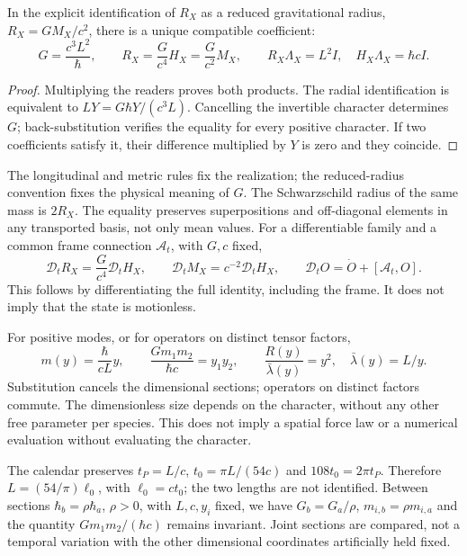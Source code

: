 \begin{proposition}
\label{hmtcuatro:gea:coeficiente} In the explicit identification of $R_X$ as a reduced gravitational radius, $R_X=GM_X/c^2$, there is a unique compatible coefficient:
\begin{equation}
G=\frac{c^3L^2}{\hbar},\qquad
R_X=\frac{G}{c^4}H_X=\frac{G}{c^2}M_X,\qquad
R_X\Lambda_X=L^2I,\quad H_X\Lambda_X=\hbar cI.
\label{hmtcuatro:gea:radial}
\end{equation}
\end{proposition}
\begin{proof}
Multiplying the readers proves both products. The radial identification is equivalent to $LY=G\hbar Y/(c^3L)$. Cancelling the invertible character determines $G$; back-substitution verifies the equality for every positive character. If two coefficients satisfy it, their difference multiplied by $Y$ is zero and they coincide.
\end{proof}

The longitudinal and metric rules fix the realization; the reduced-radius convention fixes the physical meaning of $G$. The Schwarzschild radius of the same mass is $2R_X$. The equality preserves superpositions and off-diagonal elements in any transported basis, not only mean values. For a differentiable family and a common frame connection $\mathcal A_t$, with $G,c$ fixed,
\begin{equation}
\mathcal D_tR_X=\frac{G}{c^4}\mathcal D_tH_X,\qquad
\mathcal D_tM_X=c^{-2}\mathcal D_tH_X,\qquad
\mathcal D_tO=\dot O+[\mathcal A_t,O].
\label{hmtcuatro:gea:derivada}
\end{equation}
This follows by differentiating the full identity, including the frame. It does not imply that the state is motionless.

For positive modes, or for operators on distinct tensor factors,
\begin{equation}
m(y)=\frac{\hbar}{cL}y,\qquad
\frac{Gm_1m_2}{\hbar c}=y_1y_2,\qquad
\frac{R(y)}{\bar\lambda(y)}=y^2,\quad \bar\lambda(y)=L/y.
\label{hmtcuatro:gea:adimensional}
\end{equation}
Substitution cancels the dimensional sections; operators on distinct factors commute. The dimensionless size depends on the character, without any other free parameter per species. This does not imply a spatial force law or a numerical evaluation without evaluating the character.

The calendar preserves $t_P=L/c$, $t_0=\pi L/(54c)$ and $108t_0=2\pi t_P$. Therefore $L=(54/\pi)\ell_0$, with $\ell_0=ct_0$; the two lengths are not identified. Between sections $\hbar_b=\rho\hbar_a$, $\rho>0$, with $L,c,y_i$ fixed, we have $G_b=G_a/\rho$, $m_{i,b}=\rho m_{i,a}$ and the quantity $Gm_1m_2/(\hbar c)$ remains invariant. Joint sections are compared, not a temporal variation with the other dimensional coordinates artificially held fixed.

